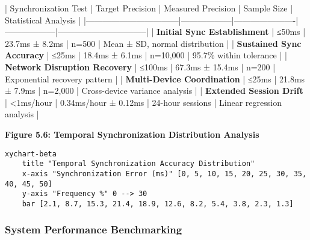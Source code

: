 \documentclass[12pt,a4paper]{article}
\begin{document}
| Synchronization Test            | Target Precision | Measured Precision   | Sample Size      | Statistical Analysis           |
|---------------------------------|------------------|----------------------|------------------|--------------------------------|
| \textbf{Initial Sync Establishment}  | ≤50ms            | 23.7ms ± 8.2ms       | n=500            | Mean ± SD, normal distribution |
| \textbf{Sustained Sync Accuracy}     | ≤25ms            | 18.4ms ± 6.1ms       | n=10,000         | 95.7\% within tolerance         |
| \textbf{Network Disruption Recovery} | ≤100ms           | 67.3ms ± 15.4ms      | n=200            | Exponential recovery pattern   |
| \textbf{Multi-Device Coordination}   | ≤25ms            | 21.8ms ± 7.9ms       | n=2,000          | Cross-device variance analysis |
| \textbf{Extended Session Drift}      | <1ms/hour        | 0.34ms/hour ± 0.12ms | 24-hour sessions | Linear regression analysis     |

\textbf{Figure 5.6: Temporal Synchronization Distribution Analysis}

\begin{verbatim}
xychart-beta
    title "Temporal Synchronization Accuracy Distribution"
    x-axis "Synchronization Error (ms)" [0, 5, 10, 15, 20, 25, 30, 35, 40, 45, 50]
    y-axis "Frequency %" 0 --> 30
    bar [2.1, 8.7, 15.3, 21.4, 18.9, 12.6, 8.2, 5.4, 3.8, 2.3, 1.3]
\end{verbatim}

\subsubsection{System Performance Benchmarking}
\end{document}
